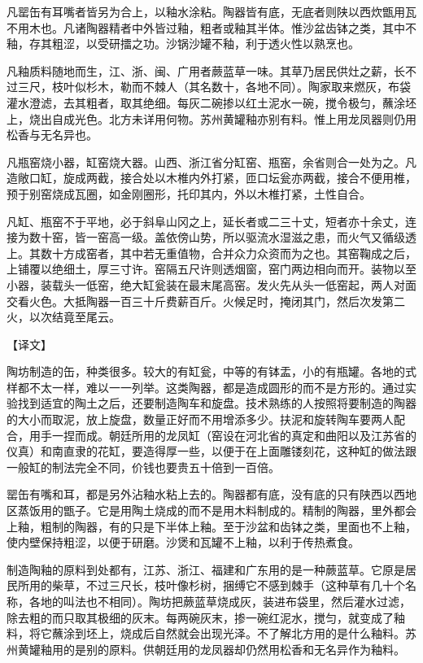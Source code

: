 \documentclass[12pt,UTF8]{ctexbook}
\begin{document}
凡罂缶有耳嘴者皆另为合上，以釉水涂粘。陶器皆有底，无底者则陕以西炊甑用瓦不用木也。凡诸陶器精者中外皆过釉，粗者或釉其半体。惟沙盆齿钵之类，其中不釉，存其粗涩，以受研擂之功。沙锅沙罐不釉，利于透火性以熟烹也。

凡釉质料随地而生，江、浙、闽、广用者蕨蓝草一味。其草乃居民供灶之薪，长不过三尺，枝叶似杉木，勒而不棘人（其名数十，各地不同）。陶家取来燃灰，布袋灌水澄滤，去其粗者，取其绝细。每灰二碗掺以红土泥水一碗，搅令极匀，蘸涂坯上，烧出自成光色。北方未详用何物。苏州黄罐釉亦别有料。惟上用龙凤器则仍用松香与无名异也。

凡瓶窑烧小器，缸窑烧大器。山西、浙江省分缸窑、瓶窑，余省则合一处为之。凡造敞口缸，旋成两截，接合处以木椎内外打紧，匝口坛瓮亦两截，接合不便用椎，预于别窑烧成瓦圈，如金刚圈形，托印其内，外以木椎打紧，土性自合。

凡缸、瓶窑不于平地，必于斜阜山冈之上，延长者或二三十丈，短者亦十余丈，连接为数十窑，皆一窑高一级。盖依傍山势，所以驱流水湿滋之患，而火气又循级透上。其数十方成窑者，其中若无重值物，合并众力众资而为之也。其窑鞠成之后，上铺覆以绝细土，厚三寸许。窑隔五尺许则透烟窗，窑门两边相向而开。装物以至小器，装载头一低窑，绝大缸瓮装在最末尾高窑。发火先从头一低窑起，两人对面交看火色。大抵陶器一百三十斤费薪百斤。火候足时，掩闭其门，然后次发第二火，以次结竟至尾云。

【译文】

陶坊制造的缶，种类很多。较大的有缸瓮，中等的有钵盂，小的有瓶罐。各地的式样都不太一样，难以一一列举。这类陶器，都是造成圆形的而不是方形的。通过实验找到适宜的陶土之后，还要制造陶车和旋盘。技术熟练的人按照将要制造的陶器的大小而取泥，放上旋盘，数量正好而不用增添多少。扶泥和旋转陶车要两人配合，用手一捏而成。朝廷所用的龙凤缸（窑设在河北省的真定和曲阳以及江苏省的仪真）和南直隶的花缸，要造得厚一些，以便于在上面雕镂刻花，这种缸的做法跟一般缸的制法完全不同，价钱也要贵五十倍到一百倍。

罂缶有嘴和耳，都是另外沾釉水粘上去的。陶器都有底，没有底的只有陕西以西地区蒸饭用的甑子。它是用陶土烧成的而不是用木料制成的。精制的陶器，里外都会上釉，粗制的陶器，有的只是下半体上釉。至于沙盆和齿钵之类，里面也不上釉，使内壁保持粗涩，以便于研磨。沙煲和瓦罐不上釉，以利于传热煮食。

制造陶釉的原料到处都有，江苏、浙江、福建和广东用的是一种蕨蓝草。它原是居民所用的柴草，不过三尺长，枝叶像杉树，捆缚它不感到棘手（这种草有几十个名称，各地的叫法也不相同）。陶坊把蕨蓝草烧成灰，装进布袋里，然后灌水过滤，除去粗的而只取其极细的灰末。每两碗灰末，掺一碗红泥水，搅匀，就变成了釉料，将它蘸涂到坯上，烧成后自然就会出现光泽。不了解北方用的是什么釉料。苏州黄罐釉用的是别的原料。供朝廷用的龙凤器却仍然用松香和无名异作为釉料。
\end{document}
